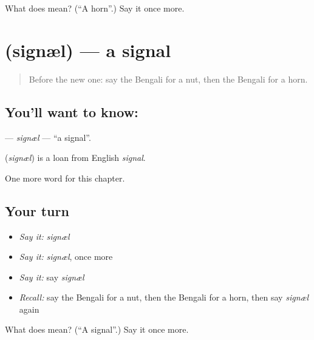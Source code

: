 \begin{tcolorbox}[breakable,colback=teal!4,colframe=teal!35!black,title={Before you move on}]
What does  mean? (\textquotedblleft{}A horn\textquotedblright{}.) Say it once more.
\end{tcolorbox}
\section[\texorpdfstring{\bn{সিগন্যাল} (signæl)}{সিগন্যাল (signæl)}]{ (signæl) — a signal}

\label{lesson:BN-C205-signl}



\begin{quote}
Before the new one: say the Bengali for a nut, then the Bengali for a horn.
\end{quote}

\subsection*{You'll want to know: }
\textbf{} — \emph{signæl} — \textquotedblleft{}a signal\textquotedblright{}.

\begin{cousinweb}
\textbf{} (\emph{signæl}) is a loan from English \emph{signal}.
\end{cousinweb}

\begin{grammarlens}[title={What you've built}]
One more word for this chapter.
\end{grammarlens}

\subsection*{Your turn}
\begin{itemize}
\raggedright
  \item \emph{Say it:} \emph{signæl}
  \item \emph{Say it:} \emph{signæl}, once more
  \item \emph{Say it:} say \emph{signæl}
  \item \emph{Recall:} say the Bengali for a nut, then the Bengali for a horn, then say \emph{signæl} again
\end{itemize}

\begin{tcolorbox}[breakable,colback=teal!4,colframe=teal!35!black,title={Before you move on}]
What does  mean? (\textquotedblleft{}A signal\textquotedblright{}.) Say it once more.
\end{tcolorbox}

